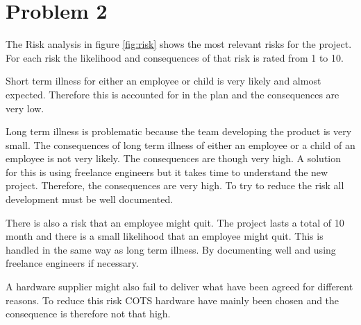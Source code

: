 \chapter{Problem 2}

The Risk analysis in figure \ref{fig:risk} shows the most relevant risks for the project. For each risk the likelihood and consequences of that risk is rated from 1 to 10.

Short term illness for either an employee or child is very likely and almost expected. Therefore this is accounted for in the plan and the consequences are very low.

Long term illness is problematic because the team developing the product is very small. The consequences of long term illness of either an employee or a child of an employee is not very likely. The consequences are though very high. A solution for this is using freelance engineers but it takes time to understand the new project. Therefore, the consequences are very high. To try to reduce the risk all development must be well documented.

There is also a risk that an employee might quit. The project lasts a total of 10 month and there is a small likelihood that an employee might quit. This is handled in the same way as long term illness. By documenting well and using freelance engineers if necessary.

A hardware supplier might also fail to deliver what have been agreed for different reasons. To reduce this risk COTS hardware have mainly been chosen and the consequence is therefore not that high.

